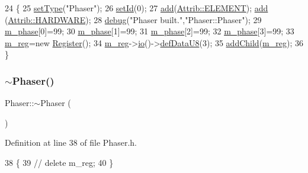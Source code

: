 \begin{DoxyCode}
24           \{
25     \hyperlink{classObject_aae534cc9d982bcb9b99fd505f2e103a5}{setType}(\textcolor{stringliteral}{"Phaser"});
26     \hyperlink{classObject_a398fe08cba594a0ce6891d59fe4f159f}{setId}(0);
27     \hyperlink{classAttrib_a235f773af19c900264a190b00a3b4ad7}{add}(\hyperlink{classAttrib_a69e171d7cc6417835a5a306d3c764235a7788bc5dd333fd8ce18562b269c9dab1}{Attrib::ELEMENT}); \hyperlink{classAttrib_a235f773af19c900264a190b00a3b4ad7}{add} (\hyperlink{classAttrib_a69e171d7cc6417835a5a306d3c764235a61ceb22149f365f1780d18f9d1459423}{Attrib::HARDWARE});
28     \hyperlink{classObject_aac010553f022165573714b7014a15f0d}{debug}(\textcolor{stringliteral}{"Phaser built."},\textcolor{stringliteral}{"Phaser::Phaser"});
29     \hyperlink{classPhaser_a04df9ce4afe7a36ccaba5e5e727d504e}{m\_phase}[0]=99;
30     \hyperlink{classPhaser_a04df9ce4afe7a36ccaba5e5e727d504e}{m\_phase}[1]=99;
31     \hyperlink{classPhaser_a04df9ce4afe7a36ccaba5e5e727d504e}{m\_phase}[2]=99;
32     \hyperlink{classPhaser_a04df9ce4afe7a36ccaba5e5e727d504e}{m\_phase}[3]=99;
33     \hyperlink{classPhaser_ab6d751d77cb1e39723a6ac85d4cfec0c}{m\_reg}=\textcolor{keyword}{new} \hyperlink{classRegister}{Register}();
34     \hyperlink{classPhaser_ab6d751d77cb1e39723a6ac85d4cfec0c}{m\_reg}->\hyperlink{classIOobject_af04fb94137c3d86849f478ac5afab5d1}{io}()->\hyperlink{classIOdata_a80bb230b61062b447db5832e43bf7b44}{defDataU8}(3);
35     \hyperlink{classHierarchy_ad677774ff38fcb257c04a3a10d471fac}{addChild}(\hyperlink{classPhaser_ab6d751d77cb1e39723a6ac85d4cfec0c}{m\_reg});
36   \}
\end{DoxyCode}
\mbox{\label{classPhaser_a1facd3a2776130beb38792025fd8be20}} 
\subsubsection{\texorpdfstring{$\sim$\+Phaser()}{~Phaser()}}
{\footnotesize\ttfamily Phaser\+::$\sim$\+Phaser (\begin{DoxyParamCaption}{ }\end{DoxyParamCaption})\hspace{0.3cm}{\ttfamily [inline]}}



Definition at line 38 of file Phaser.\+h.


\begin{DoxyCode}
38            \{
39 \textcolor{comment}{//    delete m\_reg;}
40   \}
\end{DoxyCode}


